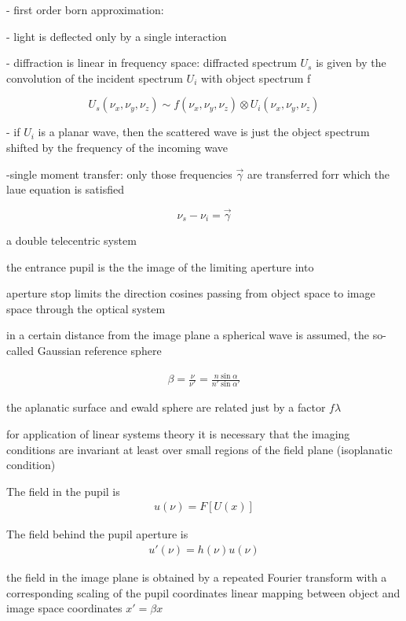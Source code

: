 - first order born approximation:

    - light is deflected only by a single interaction 

    - diffraction is linear in frequency space: diffracted spectrum $U_s$ is
      given by the convolution of the incident spectrum $U_i$ with object
      spectrum f

$$U_s(\nu_x,\nu_y,\nu_z) \sim f(\nu_x,\nu_y,\nu_z) \otimes U_i(\nu_x,\nu_y,\nu_z)$$

    - if $U_i$ is a planar wave, then the scattered wave is just the
      object spectrum shifted by the frequency of the incoming wave

    -single moment transfer: only those frequencies $\vec\gamma$ are
     transferred forr which the laue equation is satisfied

$$\nu_s-\nu_i=\vec\gamma$$





a double telecentric system



the entrance pupil is the the image of the limiting aperture into 

aperture stop limits the direction cosines passing from object space
to image space through the optical system

in a certain distance from the image plane a spherical wave is assumed,
the so-called Gaussian reference sphere


\begin{align}
  \beta = \frac{\nu}{\nu'}=\frac{n\sin\alpha}{n'\sin\alpha'}
\end{align} %

the aplanatic surface and ewald sphere are related just by a factor
$f\lambda$

for application of linear systems theory it is necessary that the
imaging conditions are invariant at least over small regions of the
field plane (isoplanatic condition)

The field in the pupil is
\begin{align}
u(\nu)=F\left[U(x)\right]
\end{align}


The field behind the pupil aperture is
\begin{align}
u'(\nu)=h(\nu) u(\nu)
\end{align}

the field in the image plane is obtained by a repeated Fourier
transform with a corresponding scaling of the pupil coordinates
linear mapping between object and image space coordinates $x'=\beta x$

